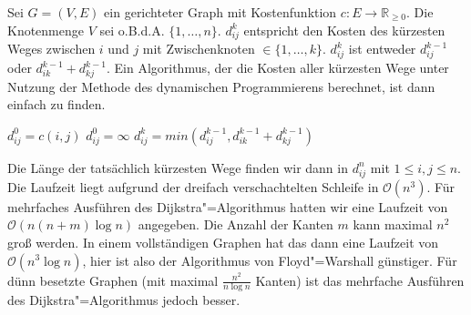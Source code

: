 Sei $G=(V,E)$ ein gerichteter Graph mit Kostenfunktion $c: E \to \mathbb{R}_{\ge 0}$. Die Knotenmenge $V$ sei o.B.d.A. $\{1, \ldots, n\}$. $d_{ij}^{k}$ entspricht den Kosten des kürzesten Weges zwischen $i$ und $j$ mit Zwischenknoten $\in \{1, \ldots, k\}$. $d_{ij}^k$ ist entweder $d_{ij}^{k-1}$ oder $d_{ik}^{k-1} + d_{kj}^{k-1}$. Ein Algorithmus, der die Kosten aller kürzesten Wege unter Nutzung der Methode des dynamischen Programmierens berechnet, ist dann einfach zu finden.

\begin{Alg}[von Floyd"=Warshall (dynamisches Programmieren)]
  \begin{algorithmic}[1]
          \State $d_{ij}^0 = c(i,j)$
        \Else
          \State $d_{ij}^0 = \infty$
        \EndIf
      \EndFor
    \EndFor
          \State $d_{ij}^k = min(d_{ij}^{k-1}, d_{ik}^{k-1} + d_{kj}^{k-1})$\label{kap6FWAlgEntfernungBerechnen}
        \EndFor
      \EndFor
    \EndFor
  \end{algorithmic}
\end{Alg}

%

Die Länge der tatsächlich kürzesten Wege finden wir dann in $d_{ij}^n$ mit $1 \le i, j \le n$. Die Laufzeit liegt aufgrund der dreifach verschachtelten Schleife in $\mathcal{O}(n^3)$. Für mehrfaches Ausführen des Dijkstra"=Algorithmus hatten wir eine Laufzeit von $\mathcal{O}(n (n+m) \log n)$ angegeben. Die Anzahl der Kanten $m$ kann maximal $n^2$ groß werden. In einem vollständigen Graphen hat das dann eine Laufzeit von $\mathcal{O}(n^3 \log n)$, hier ist also der Algorithmus von Floyd"=Warshall günstiger. Für dünn besetzte Graphen (mit maximal $\frac{n^2}{n \log n}$ Kanten) ist das mehrfache Ausführen des Dijkstra"=Algorithmus jedoch besser.

